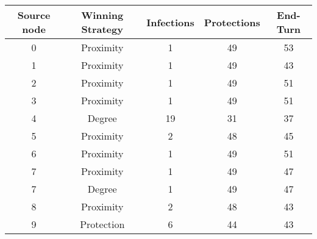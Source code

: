 \documentclass[results.tex]{subfiles}
\begin{document}
    \begin{center}
        \begin{tabular}{| c || c | c | c | c |}
            \hline
            {\bfseries Source node} & {\bfseries Winning Strategy} & {\bfseries Infections} & {\bfseries Protections}
            & {\bfseries End-Turn}
            \\  %
            \hline\hline
            0                       & Proximity                    & 1                      & 49                      & 53                   \\
            \hline
            1                       & Proximity                    & 1                      & 49                      & 43                   \\
            \hline
            2                       & Proximity                    & 1                      & 49                      & 51                   \\
            \hline
            3                       & Proximity                    & 1                      & 49                      & 51                   \\
            \hline
            4                       & Degree                       & 19                     & 31                      & 37                   \\
            \hline
            5                       & Proximity                    & 2                      & 48                      & 45                   \\
            \hline
            6                       & Proximity                    & 1                      & 49                      & 51                   \\
            \hline
            7                       & Proximity                    & 1                      & 49                      & 47                   \\
            \hline
            7                       & Degree                       & 1                      & 49                      & 47                   \\
            \hline
            8                       & Proximity                    & 2                      & 48                      & 43                   \\
            \hline
            9                       & Protection                   & 6                      & 44                      & 43                   \\

\end{tabular}
\end{center}
\end{document}
